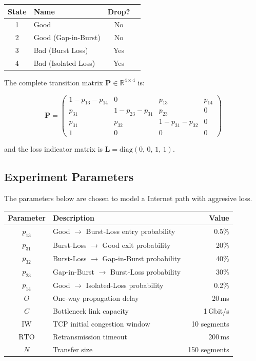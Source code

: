 \documentclass[11pt,letterpaper]{article}
\begin{document}
\begin{center}
\begin{tabular}{clcc}
\toprule
State & Name & Drop? \\
\midrule
1 & Good                 & No  \\
2 & Good (Gap-in-Burst)  & No  \\
3 & Bad  (Burst Loss)    & Yes \\
4 & Bad  (Isolated Loss) & Yes \\
\bottomrule
\end{tabular}
\end{center}

The complete transition matrix $\mathbf{P} \in \mathbb{R}^{4\times 4}$ is:

\[
\mathbf{P} =
\begin{pmatrix}
1-p_{13}-p_{14} & 0               & p_{13}           & p_{14} \\
p_{31}          & 1-p_{23}-p_{31} & p_{23}            & 0      \\
p_{31}          & p_{32}          & 1-p_{31}-p_{32}   & 0      \\
1               & 0               & 0                 & 0
\end{pmatrix}
\]

and the loss indicator matrix is $\mathbf{L} = \mathrm{diag}(0,\,0,\,1,\,1)$.

\subsection{Experiment Parameters}

The parameters below are chosen to model a Internet path with aggresive loss.

\begin{center}
\begin{tabular}{clr}
\toprule
Parameter & Description & Value \\
\midrule
$p_{13}$ & Good $\to$ Burst-Loss entry probability  & 0.5\%  \\
$p_{31}$ & Burst-Loss $\to$ Good exit probability   & 20\%   \\
$p_{32}$ & Burst-Loss $\to$ Gap-in-Burst probability & 40\%  \\
$p_{23}$ & Gap-in-Burst $\to$ Burst-Loss probability & 30\%  \\
$p_{14}$ & Good $\to$ Isolated-Loss probability      & 0.2\% \\
$O$      & One-way propagation delay                 & 20\,ms \\
$C$      & Bottleneck link capacity                  & 1\,Gbit/s \\
$\mathrm{IW}$ & TCP initial congestion window       & 10 segments \\
$\mathrm{RTO}$ & Retransmission timeout             & 200\,ms \\
$N$      & Transfer size                            & 150 segments \\
\bottomrule
\end{tabular}
\end{center}
\end{document}
